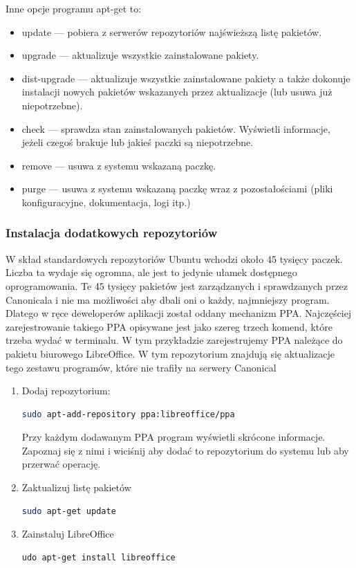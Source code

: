Inne opcje programu apt-get to:

\begin{itemize}
\item \textcolor{ubuntu_orange}{update} --- pobiera z serwerów repozytoriów najświeższą listę pakietów.
\item \textcolor{ubuntu_orange}{upgrade} --- aktualizuje wszystkie zainstalowane pakiety.
\item \textcolor{ubuntu_orange}{dist-upgrade} --- aktualizuje wszystkie zainstalowane pakiety a także dokonuje instalacji nowych pakietów wskazanych przez aktualizacje (lub usuwa już niepotrzebne).
\item \textcolor{ubuntu_orange}{check} --- sprawdza stan zainstalowanych pakietów. Wyświetli informacje, jeżeli czegoś brakuje lub jakieś paczki są niepotrzebne.
\item \textcolor{ubuntu_orange}{remove} --- usuwa z systemu wskazaną paczkę.
\item \textcolor{ubuntu_orange}{purge} --- usuwa z systemu wskazaną paczkę wraz z pozostałościami (pliki konfiguracyjne, dokumentacja, logi itp.)
\end{itemize}

\subsubsection{Instalacja dodatkowych repozytoriów}
W skład standardowych repozytoriów Ubuntu wchodzi około 45 tysięcy paczek. Liczba ta wydaje się ogromna, ale jest to jedynie ułamek dostępnego oprogramowania. Te 45 tysięcy pakietów jest zarządzanych i sprawdzanych przez Canonicala i nie ma możliwości aby dbali oni o każdy, najmniejszy program. Dlatego w ręce deweloperów aplikacji został oddany mechanizm PPA. Najczęściej zarejestrowanie takiego PPA opisywane jest jako szereg trzech komend, które trzeba wydać w terminalu. W tym przykładzie zarejestrujemy PPA należące do pakietu biurowego LibreOffice. W tym repozytorium znajdują się aktualizacje tego zestawu programów, które nie trafiły na serwery Canonical
\begin{enumerate}
\item Dodaj repozytorium:
\begin{lstlisting}[language=bash]
sudo apt-add-repository ppa:libreoffice/ppa
\end{lstlisting}
Przy każdym dodawanym PPA program wyświetli skrócone informacje. Zapoznaj się z nimi i wiciśnij \keys{\returnwin} aby dodać to repozytorium do systemu lub  aby przerwać operację.
\item Zaktualizuj listę pakietów
\begin{lstlisting}[language=bash]
sudo apt-get update
\end{lstlisting}
\item Zainstaluj LibreOffice
\begin{lstlisting}[language=bash]
udo apt-get install libreoffice
\end{lstlisting}
\end{enumerate}

